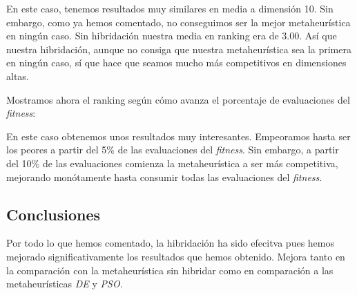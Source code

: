 \documentclass[11pt]{article}
\begin{document}
En este caso, tenemos resultados muy similares en media a dimensión 10. Sin embargo, como ya hemos comentado, no conseguimos ser la mejor metaheurística en ningún caso. Sin hibridación nuestra media en ranking era de 3.00. Así que nuestra hibridación, aunque no consiga que nuestra metaheurística sea la primera en ningún caso, sí que hace que seamos mucho más competitivos en dimensiones altas.

Mostramos ahora el ranking según cómo avanza el porcentaje de evaluaciones del \emph{fitness}:

\begin{table}[H]
\centering
{}
    \caption{Ranking según el avance del porcentaje de evaluaciones consumidas}
    \label{ranking_30_memetic}
\end{table}

En este caso obtenemos unos resultados muy interesantes. Empeoramos hasta ser los peores a partir del 5\% de las evaluaciones del \emph{fitness}. Sin embargo, a partir del 10\% de las evaluaciones comienza la metaheurística a ser más competitiva, mejorando monótamente hasta consumir todas las evaluaciones del \emph{fitness}.

\subsection{Conclusiones}

Por todo lo que hemos comentado, la hibridación ha sido efecitva pues hemos mejorado significativamente los resultados que hemos obtenido. Mejora tanto en la comparación con la metaheurística sin hibridar como en comparación a las metaheurísticas \emph{DE} y \emph{PSO}.
\end{document}

